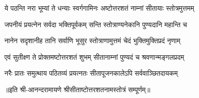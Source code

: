 \twolineshloka
{ये पठन्ति नरा भूम्यां ते धन्याः स्वर्गगामिनः}
{अष्टोत्तरशतं नाम्नां सीतायाः स्तोत्रमुत्तमम्}

\twolineshloka
{जपनीयं प्रयत्नेन सर्वदा भक्तिपूर्वकम्}
{सन्ति स्तोत्राण्यनेकानि पुण्यदानि महान्ति च}

\twolineshloka
{नानेन सदृशानीह तानि सर्वाणि भूसुर}
{स्तोत्राणामुत्तमं चेदं भुक्तिमुक्तिप्रदं नृणाम्}

\twolineshloka
{एवं सुतीक्ष्ण ते प्रोक्तमष्टोत्तरशतं शुभम्}
{सीतानाम्नां पुण्यदं च श्रवणान्मङ्गलप्रदम्}

\twolineshloka
{नरैः प्रातः समुत्थाय पठितव्यं प्रयत्नतः}
{सीतापूजनकालेऽपि सर्ववाञ्छितदायकम्}

{॥इति श्री-आनन्दरामायणे श्रीसीताष्टोत्तरशतनामस्तोत्रं सम्पूर्णम्॥}

